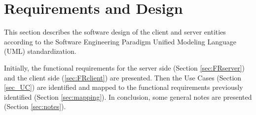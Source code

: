 \documentclass[finalReport.tex]{subfiles}
\begin{document}
\chapter{Requirements and Design}\label{ch:r-d}


This section describes the software design of the client and server entities according to the Software Engineering Paradigm Unified Modeling Language (UML) standardization.

Initially, the functional requirements for the server side (Section \ref{sec:FRserver}) and the client side (\ref{sec:FRclient}) are presented. Then the Use Cases (Section \ref{sec_UC}) are identified and mapped to the functional requirements previously identified (Section \ref{sec:mapping}). In conclusion, some general notes are presented (Section \ref{sec:notes}). 
\end{document}

